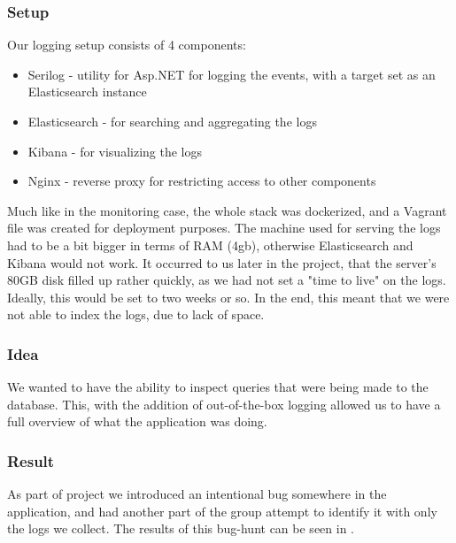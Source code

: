 \subsubsection{Setup}
Our logging setup consists of 4 components:
\begin{itemize}
    \item Serilog - utility for Asp.NET for logging the events, with a target set as an Elasticsearch instance
    \item Elasticsearch - for searching and aggregating the logs
    \item Kibana - for visualizing the logs 
    \item Nginx - reverse proxy for restricting access to other components
\end{itemize}
Much like in the monitoring case, the whole stack was dockerized, and a Vagrant file was created for deployment purposes. The machine used for serving the logs had to be a bit bigger in terms of RAM (4gb), otherwise Elasticsearch and Kibana would not work.
It occurred to us later in the project, that the server's 80GB disk filled up rather quickly, as we had not set a "time to live" on the logs. Ideally, this would be set to two weeks or so. In the end, this meant that we were not able to index the logs, due to lack of space.

\subsubsection{Idea}
We wanted to have the ability to inspect queries that were being made to the database. This, with the addition of out-of-the-box logging allowed us to have a full overview of what the application was doing.

\subsubsection{Result}
As part of project we introduced an intentional bug somewhere in the application, and had another part of the group attempt to identify it with only the logs we collect.
The results of this bug-hunt can be seen in \cite{bugs}.